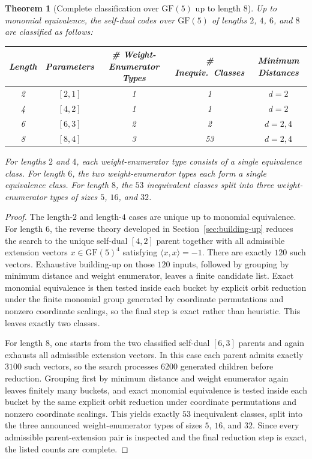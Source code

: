 \documentclass[12pt]{article}
\newtheorem{theorem}{Theorem}[section]
\newcommand{\GF}[1]{\ensuremath{\mathrm{GF}(#1)}}
\newenvironment{blueblock}{\begingroup\color{blue}}{\endgroup}
\begin{document}
\begin{blueblock}
\begin{theorem}[Complete classification over $\GF{5}$ up to length $8$]
\label{thm:gf5-classification}
Up to monomial equivalence, the self-dual codes over $\GF{5}$ of lengths $2$, $4$, $6$, and $8$ are classified as follows:
\begin{center}
\setlength{\tabcolsep}{4.5pt}
\small
\begin{tabular}{ccccc}
\toprule
Length & Parameters & \# Weight-Enumerator Types & \# Inequiv.\ Classes & Minimum Distances \\
\midrule
2 & $[2,1]$ & 1 & 1 & $d = 2$ \\
4 & $[4,2]$ & 1 & 1 & $d = 2$ \\
6 & $[6,3]$ & 2 & 2 & $d = 2,4$ \\
8 & $[8,4]$ & 3 & 53 & $d = 2,4$ \\
\bottomrule
\end{tabular}
\end{center}
For lengths $2$ and $4$, each weight-enumerator type consists of a single equivalence class. For length $6$, the two weight-enumerator types each form a single equivalence class. For length $8$, the $53$ inequivalent classes split into three weight-enumerator types of sizes $5$, $16$, and $32$.
\end{theorem}

\begin{proof}
The length-$2$ and length-$4$ cases are unique up to monomial equivalence. For length $6$, the reverse theory developed in Section~\ref{sec:building-up} reduces the search to the unique self-dual $[4,2]$ parent together with all admissible extension vectors $x\in \GF{5}^4$ satisfying $\langle x,x\rangle=-1$. There are exactly $120$ such vectors. Exhaustive building-up on those $120$ inputs, followed by grouping by minimum distance and weight enumerator, leaves a finite candidate list. Exact monomial equivalence is then tested inside each bucket by explicit orbit reduction under the finite monomial group generated by coordinate permutations and nonzero coordinate scalings, so the final step is exact rather than heuristic. This leaves exactly two classes.

For length $8$, one starts from the two classified self-dual $[6,3]$ parents and again exhausts all admissible extension vectors. In this case each parent admits exactly $3100$ such vectors, so the search processes $6200$ generated children before reduction. Grouping first by minimum distance and weight enumerator again leaves finitely many buckets, and exact monomial equivalence is tested inside each bucket by the same explicit orbit reduction under coordinate permutations and nonzero coordinate scalings. This yields exactly $53$ inequivalent classes, split into the three announced weight-enumerator types of sizes $5$, $16$, and $32$. Since every admissible parent-extension pair is inspected and the final reduction step is exact, the listed counts are complete.
\end{proof}
\end{blueblock}
\end{document}
